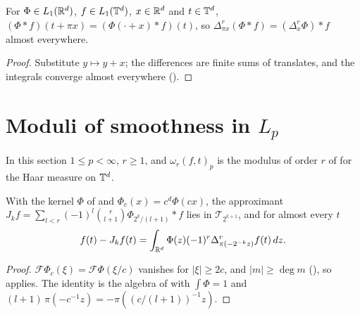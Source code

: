 \begin{lemma}
\label{lem:torus-econv-differences}
\leanok
{}
For $\Phi \in L_1(\mathbb{R}^d)$, $f \in L_1(\mathbb{T}^d)$, $x \in \mathbb{R}^d$ and $t \in \mathbb{T}^d$,
$(\Phi * f)(t + \pi x) = (\Phi(\cdot + x) * f)(t)$, so
$\Delta^r_{\pi x}(\Phi * f) = (\Delta^r_x \Phi) * f$ almost everywhere.
\end{lemma}

\begin{proof}
\leanok
Substitute $y \mapsto y + x$; the differences are finite sums of translates, and the integrals
converge almost everywhere ().
\end{proof}

\section{Moduli of smoothness in \texorpdfstring{$L_p$}{L\_p}}
\label{sec:torus-lp-moduli}

In this section $1 \leq p < \infty$, $r \geq 1$, and $\omega_r(f, t)_p$ is the modulus of order $r$
of  for the Haar measure on $\mathbb{T}^d$.

\begin{lemma}
\label{lem:torus-lp-jackson-approx}
\leanok
{}
With the kernel $\Phi$ of  and $\Phi_c(x) = c^d \Phi(c x)$, the approximant
$J_k f = \sum_{l < r} (-1)^l \binom{r}{l+1} \Phi_{2^k/(l+1)} * f$ lies in $\mathcal{T}_{2^{k+1}}$,
and for almost every $t$
\[
  f(t) - J_k f(t) = \int_{\mathbb{R}^d} \Phi(z) (-1)^r \Delta^r_{\pi(-2^{-k} z)} f(t) \, dz .
\]
\end{lemma}

\begin{proof}
\leanok
$\mathcal{F}\Phi_c(\xi) = \mathcal{F}\Phi(\xi / c)$ vanishes for $|\xi| \geq 2c$, and
$|m| \geq \deg m$ (), so  applies. The
identity is the algebra of  with $\int \Phi = 1$ and
$(l+1) \, \pi(-c^{-1} z) = -\pi((c/(l+1))^{-1} z)$.
\end{proof}

